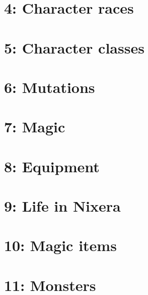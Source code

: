 \documentclass[a4paper]{book}
\begin{document}
\section{4: Character races}

\section{5: Character classes}

\section{6: Mutations}

\section{7: Magic}

\section{8: Equipment}

\section{9: Life in Nixera}

\section{10: Magic items}

\section{11: Monsters}
\end{document}
